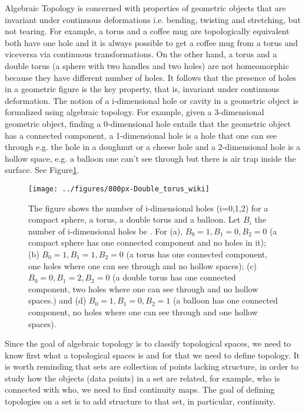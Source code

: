 \documentclass[onecollarge,runningheads]{svjour2}
\begin{document}
Algebraic Topology is concerned with properties of geometric objects that are invariant under continuous deformations i.e. bending, twisting and stretching, but not tearing.
For example, a torus and a coffee mug are topologically equivalent both have one hole and it is always possible to get a coffee mug from a torus and viceversa via continuous transformations. On the other hand, a torus and a double torus (a sphere with two handles and two holes) are not homeomorphic because they have different number of holes.
It follows that the presence of holes in a geometric figure is the key property, that is, invariant under continuous deformation. The notion of a i-dimensional hole or cavity in a geometric object is formalized using algebraic topology. For example, given a 3-dimensional geometric object, finding a 0-dimensional hole entails that the geometric object has a connected component, a 1-dimensional hole is a hole that one can see through e.g. the hole in a doughnut or a cheese hole and a 2-dimensional hole is a hollow space, e.g. a balloon one can't see through but there is air trap inside the surface. See Figure\ref{fig:iholes}.

 \begin{figure}[h]
        \centering
        \texttt{[image: ../figures/800px-Double\_torus\_wiki]}
        \caption{The figure shows the number of i-dimensional holes (i=0,1,2) for a compact sphere, a torus, a double torus and a balloon.
        Let $B_i$ the number of i-dimensional holes be . For (a), $B_0=1, B_1=0, B_2=0$ (a compact sphere has one connected component and no holes in it); (b) $B_0=1, B_1=1, B_2=0$ (a torus has one connected component, one holes where one can see through and no hollow spaces); (c) $B_0=0, B_1=2, B_2=0$ (a double torus has one connected component, two holes where one can see through and no hollow spaces.) and (d) $B_0=1, B_1=0, B_2=1$ (a balloon has one connected component, no holes where one can see through and one hollow spaces).
        }
\label{fig:iholes}
\end{figure}

Since the goal of algebraic topology is to classify topological spaces, we need to know first what a topological spaces is and for that we need to define topology. It is worth reminding that sets are collection of points lacking structure, in order to study how the objects (data points) in a set are related, for example, who is connected with who, we need to find continuity maps. The goal of defining topologies on a set is to add structure to that set, in particular, continuity.
\end{document}
